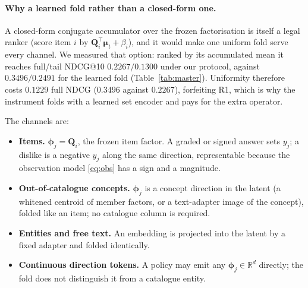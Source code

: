 \documentclass[manuscript,screen,review]{acmart}
\newcommand{\R}{\mathbb{R}}
\newcommand{\Q}{\mathbf{Q}}
\newcommand{\bphi}{\boldsymbol{\phi}}
\newcommand{\bmu}{\boldsymbol{\mu}}
\begin{document}
\paragraph{Why a learned fold rather than a closed-form one.} A closed-form conjugate accumulator over the frozen factorisation is itself a legal ranker (score item $i$ by $\Q_i^\top\bmu_t+\beta_i$), and it would make one uniform fold serve every channel. We measured that option: ranked by its accumulated mean it reaches full/tail NDCG@10 $0.2267/0.1300$ under our protocol, against $0.3496/0.2491$ for the learned fold (Table~\ref{tab:master}). Uniformity therefore costs $0.1229$ full NDCG ($0.3496$ against $0.2267$), forfeiting R1, which is why the instrument folds with a learned set encoder and pays for the extra operator.

The channels are:
\begin{itemize}[leftmargin=1.4em,itemsep=1.5pt]
  \item \textbf{Items.} $\bphi_j=\Q_i$, the frozen item factor. A graded or signed answer sets $y_j$; a dislike is a negative $y_j$ along the same direction, representable because the observation model \eqref{eq:obs} has a sign and a magnitude.
  \item \textbf{Out-of-catalogue concepts.} $\bphi_j$ is a concept direction in the latent (a whitened centroid of member factors, or a text-adapter image of the concept), folded like an item; no catalogue column is required.
  \item \textbf{Entities and free text.} An embedding is projected into the latent by a fixed adapter and folded identically.
  \item \textbf{Continuous direction tokens.} A policy may emit any $\bphi_j\in\R^{d}$ directly; the fold does not distinguish it from a catalogue entity.
\end{itemize}
\end{document}
